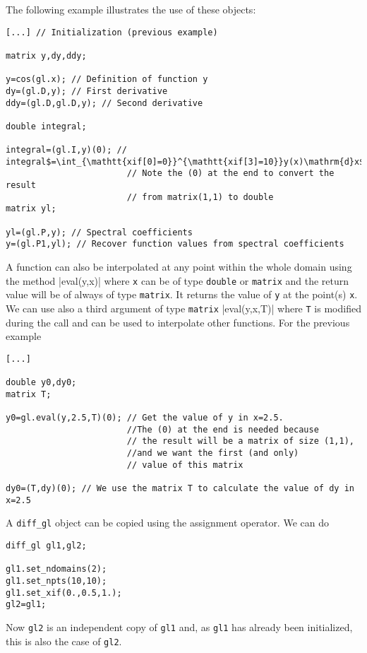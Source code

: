 The following example illustrates the use of these objects:
\begin{verbatim}
[...] // Initialization (previous example)

matrix y,dy,ddy;

y=cos(gl.x); // Definition of function y
dy=(gl.D,y); // First derivative 
ddy=(gl.D,gl.D,y); // Second derivative 

double integral;

integral=(gl.I,y)(0); // integral$=\int_{\mathtt{xif[0]=0}}^{\mathtt{xif[3]=10}}y(x)\mathrm{d}x$
						// Note the (0) at the end to convert the result 
						// from matrix(1,1) to double
matrix yl;

yl=(gl.P,y); // Spectral coefficients
y=(gl.P1,yl); // Recover function values from spectral coefficients

\end{verbatim}

A function can also be interpolated at any point within the whole domain using the method
|eval(y,x)|
where \texttt{x} can be of type \texttt{double} or \texttt{matrix} and the return value will be 
of always of type \texttt{matrix}. It returns the value of \texttt{y} at the point(s) \texttt{x}.
We can use also a third argument of type \texttt{matrix}
|eval(y,x,T)|
where \texttt{T} is modified during the call and can be used to interpolate other functions. 
For the previous example
\begin{verbatim}
[...]

double y0,dy0;
matrix T;

y0=gl.eval(y,2.5,T)(0); // Get the value of y in x=2.5. 
						//The (0) at the end is needed because
						// the result will be a matrix of size (1,1), 
						//and we want the first (and only)
						// value of this matrix
								
dy0=(T,dy)(0); // We use the matrix T to calculate the value of dy in x=2.5

\end{verbatim}

A {\tt diff\_gl} object can be copied using the assignment operator. We can do
\begin{verbatim}
diff_gl gl1,gl2;

gl1.set_ndomains(2);
gl1.set_npts(10,10);
gl1.set_xif(0.,0.5,1.);
gl2=gl1; 
\end{verbatim}
Now {\tt gl2} is an independent copy of {\tt gl1} and, as {\tt gl1} has already been initialized, this 
is also the case of {\tt gl2}.

